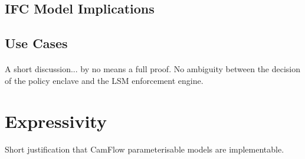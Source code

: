 \subsection{IFC Model Implications}

\subsection{Use Cases}

\paragraph{} A short discussion... by no means a full proof. No ambiguity between the decision of the policy enclave and the LSM enforcement engine.
\section{Expressivity}

\paragraph{} Short justification that CamFlow parameterisable models are implementable.